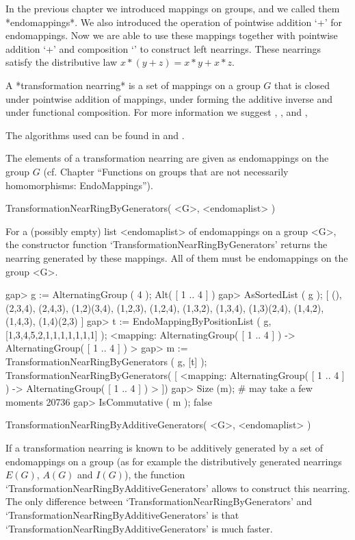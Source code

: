%
%

In the previous chapter we introduced mappings on groups, and we
called them *endomappings*.  We also introduced the operation of
pointwise addition `+' for endomappings. Now we are able to use these
mappings together with pointwise addition `+' and composition `\*' to
construct left nearrings. These nearrings satisfy the distributive
law $x * (y + z) = x * y + x * z$.

A *transformation nearring* is a set of mappings on a group $G$ that
is closed under pointwise addition of mappings, under forming the
additive inverse and under functional composition. For more
information we suggest \cite{Pilz:Nearrings}, \cite{meldrum85:NATLWG},
and \cite{Clay:Nearrings},

The algorithms used can be found in
\cite{aichingereckernoebauer00:TUOCINT} and \cite{aichingerea00:CWN}.

The elements of a transformation nearring are given as endomappings on
the group $G$ (cf. Chapter ``Functions on groups that are not
necessarily homomorphisms: EndoMappings'').




\>TransformationNearRingByGenerators( <G>, <endomaplist> )

For a (possibly empty) list <endomaplist> of endomappings on a group
<G>, the constructor function `TransformationNearRingByGenerators' returns the
nearring  generated by these mappings. All of them must be
endomappings on the group <G>.

\beginexample
    gap> g := AlternatingGroup ( 4 );
    Alt( [ 1 .. 4 ] )
    gap> AsSortedList ( g );
    [ (), (2,3,4), (2,4,3), (1,2)(3,4), (1,2,3), (1,2,4), (1,3,2), 
      (1,3,4), (1,3)(2,4), (1,4,2), (1,4,3), (1,4)(2,3) ]
    gap> t := EndoMappingByPositionList ( g, [1,3,4,5,2,1,1,1,1,1,1,1] );
    <mapping: AlternatingGroup( [ 1 .. 4 ] ) -> AlternatingGroup( 
    [ 1 .. 4 ] ) >
    gap> m := TransformationNearRingByGenerators ( g, [t] );
    TransformationNearRingByGenerators(
    [ <mapping: AlternatingGroup( [ 1 .. 4 ] ) -> AlternatingGroup( 
        [ 1 .. 4 ] ) > ])
    gap> Size (m); # may take a few moments
    20736
    gap> IsCommutative ( m );
    false
\endexample

\>TransformationNearRingByAdditiveGenerators( <G>, <endomaplist> )

If a transformation nearring is known to be additively generated by a
set of endomappings on a group (as for example the distributively
generated nearrings $E(G)$, $A(G)$ and $I(G)$), the function
`Trans\-formation\-NearRing\-By\-Additive\-Generators' allows to
construct this nearring. The only difference between
`TransformationNearRingByGenerators' and
`Trans\-formation\-NearRing\-By\-Additive\-Generators' is that
`Trans\-formation\-NearRing\-By\-Additive\-Generators' is much faster.

